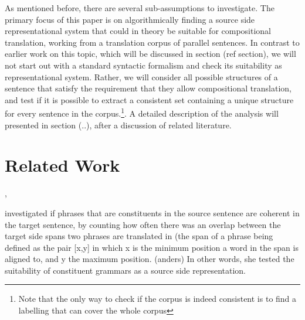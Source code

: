 \documentclass{report}
\theoremstyle{definition}
\theoremstyle{plain}
\begin{document}



As mentioned before, there are several sub-assumptions to investigate. The primary focus of this paper is on algorithmically finding a source side representational system that could in theory be suitable for compositional translation, working from a translation corpus of parallel sentences. In contrast to earlier work on this topic, which will be discussed in section (ref section), we will not start out with a standard syntactic formalism and check its suitability as representational system. Rather, we will consider all possible structures of a sentence that satisfy the requirement that they allow compositional translation, and test if it is possible to extract a consistent set containing a unique structure for every sentence in the corpus.\footnote{Note that the only way to check if the corpus is indeed consistent is to find a labelling that can cover the whole corpus}. A detailed description of the analysis will presented in section (..), after a discussion of related literature.


\section{Related Work}


\cite{galley2004s}, \cite{deneefe2007can}

\cite{fox2002phrasal} investigated if phrases that are constituents in the source sentence are coherent in the target sentence, by counting how often there was an overlap between the target side spans two phrases are translated in (the span of a phrase being defined as the pair [x,y] in which x is the minimum position a word in the span is aligned to, and y the maximum position. (anders) In other words, she tested the suitability of constituent grammars as a source side representation. 
\end{document}
